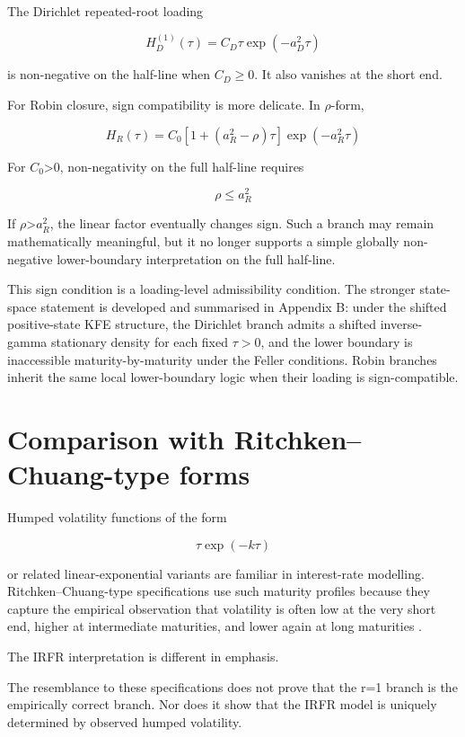 \documentclass[11pt,oneside]{book}
\begin{document}
The Dirichlet repeated-root loading

\[
H_D^{(1)}(\tau) = C_D \tau \exp(-a_D^2\tau)
\]

is non-negative on the half-line when $C_D\geq0$. It also vanishes at the
short end.

For Robin closure, sign compatibility is more delicate. In $\rho$-form,

\[
H_R(\tau) = C_0[1 + (a_R^2 - \rho)\tau] \exp(-a_R^2\tau)
\]

For $C_0$\textgreater0, non-negativity on the full half-line requires

\[
\rho \le a_R^2
\]

If $\rho$\textgreater $a_R^2$, the linear factor eventually changes sign. Such
a branch may remain mathematically meaningful, but it no longer supports
a simple globally non-negative lower-boundary interpretation on the full
half-line.

This sign condition is a loading-level admissibility condition. The
stronger state-space statement is developed and summarised
in Appendix B: under the shifted positive-state KFE structure, the
Dirichlet branch admits a shifted inverse-gamma stationary density for
each fixed $\tau>0$, and the lower boundary is inaccessible
maturity-by-maturity under the Feller conditions. Robin branches inherit
the same local lower-boundary logic when their loading is
sign-compatible.

\section{Comparison with Ritchken--Chuang-type
forms}\label{comparison-with-ritchken-chuang-type-forms}

Humped volatility functions of the form

\[
\tau \exp(-k\tau)
\]

or related linear-exponential variants are familiar in interest-rate
modelling. Ritchken--Chuang-type specifications use such maturity
profiles because they capture the empirical observation that volatility
is often low at the very short end, higher at intermediate maturities,
and lower again at long maturities \cite{RitchkenChuang1999,RitchkenSankarasubramanian1995}.

The IRFR interpretation is different in emphasis.

The resemblance to these specifications does not prove that the r=1
branch is the empirically correct branch. Nor does it show that the IRFR
model is uniquely determined by observed humped volatility.
\end{document}
